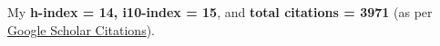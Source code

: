 My \textbf{h-index = 14, i10-index = 15}, and \textbf{total citations = 3971} (as per \href{https://scholar.google.com/citations?hl=en&user=6-7FYjIAAAAJ&authuser=2}{Google Scholar Citations}).

\nocite{*}

\printbibliography[heading={none},type=article]